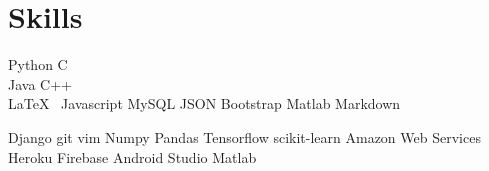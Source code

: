 
\section{Skills}
Python \textbullet{}   C \\
Java \textbullet{} C++ \\
\LaTeX\ \textbullet{} Javascript \textbullet{} MySQL \textbullet{} JSON \textbullet{} Bootstrap \textbullet{} Matlab \textbullet{} Markdown
\sectionsep

Django \textbullet{} git \textbullet{} vim \textbullet{} Numpy \textbullet{} Pandas \textbullet{} Tensorflow \textbullet{} scikit-learn \textbullet{} Amazon Web Services \textbullet{} Heroku \textbullet{} Firebase \textbullet{} Android Studio \textbullet{} Matlab
\sectionsep